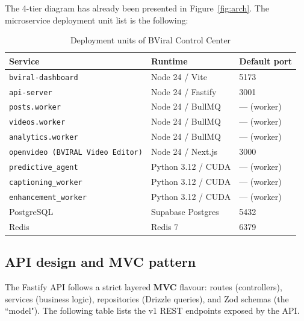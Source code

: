 The 4-tier diagram has already been presented in Figure~\ref{fig:arch}. The microservice
deployment unit list is the following:

\begin{table}[H]
\centering
\caption{Deployment units of BViral Control Center}
\label{tab:units}
\small
\begin{tabular}{lll}
\toprule
\textbf{Service} & \textbf{Runtime} & \textbf{Default port} \\
\midrule
\texttt{bviral-dashboard}     & Node 24 / Vite      & 5173 \\
\texttt{api-server}           & Node 24 / Fastify   & 3001 \\
\texttt{posts.worker}         & Node 24 / BullMQ    & --- (worker)  \\
\texttt{videos.worker}        & Node 24 / BullMQ    & --- (worker)  \\
\texttt{analytics.worker}     & Node 24 / BullMQ    & --- (worker)  \\
\texttt{openvideo (BVIRAL Video Editor)} & Node 24 / Next.js   & 3000 \\
\texttt{predictive\_agent}    & Python 3.12 / CUDA  & --- (worker)  \\
\texttt{captioning\_worker}   & Python 3.12 / CUDA  & --- (worker)  \\
\texttt{enhancement\_worker}  & Python 3.12 / CUDA  & --- (worker)  \\
PostgreSQL                   & Supabase Postgres   & 5432 \\
Redis                        & Redis 7             & 6379 \\
\bottomrule
\end{tabular}
\end{table}

\subsection{API design and MVC pattern}
\label{sec:mvc}

The Fastify API follows a strict layered \textbf{MVC} flavour: routes (controllers), services
(business logic), repositories (Drizzle queries), and Zod schemas (the ``model"). The
following table lists the v1 REST endpoints exposed by the API.

